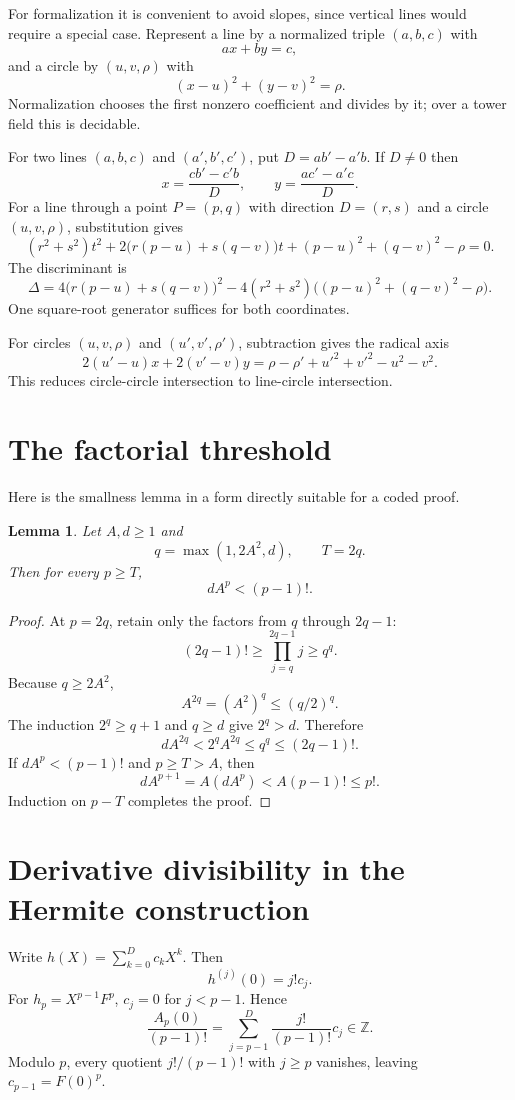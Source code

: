 \documentclass[11pt]{article}
\newtheorem{lemma}[theorem]{Lemma}
\newcommand{\Z}{\mathbb{Z}}
\begin{document}
For formalization it is convenient to avoid slopes, since vertical lines would require a special case.  Represent a line by a normalized triple $(a,b,c)$ with
\[
  ax+by=c,
\]
and a circle by $(u,v,\rho)$ with
\[
  (x-u)^2+(y-v)^2=\rho.
\]
Normalization chooses the first nonzero coefficient and divides by it; over a tower field this is decidable.

For two lines $(a,b,c)$ and $(a',b',c')$, put $D=ab'-a'b$.  If $D\ne0$ then
\[
  x=\frac{cb'-c'b}{D},\qquad
  y=\frac{ac'-a'c}{D}.
\]
For a line through a point $P=(p,q)$ with direction $D=(r,s)$ and a circle $(u,v,\rho)$, substitution gives
\[
  (r^2+s^2)t^2
 +2\bigl(r(p-u)+s(q-v)\bigr)t
 +(p-u)^2+(q-v)^2-\rho=0.
\]
The discriminant is
\[
  \Delta=4\bigl(r(p-u)+s(q-v)\bigr)^2
          -4(r^2+s^2)\bigl((p-u)^2+(q-v)^2-\rho\bigr).
\]
One square-root generator suffices for both coordinates.

For circles $(u,v,\rho)$ and $(u',v',\rho')$, subtraction gives the radical axis
\[
  2(u'-u)x+2(v'-v)y
   =\rho-\rho'+u'^2+v'^2-u^2-v^2.
\]
This reduces circle-circle intersection to line-circle intersection.

\section{The factorial threshold}\label{app:factorial}

Here is the smallness lemma in a form directly suitable for a coded proof.

\begin{lemma}
Let $A,d\ge1$ and
\[
  q=\max(1,2A^2,d),\qquad T=2q.
\]
Then for every $p\ge T$,
\[
  dA^p<(p-1)!.
\]
\end{lemma}

\begin{proof}
At $p=2q$, retain only the factors from $q$ through $2q-1$:
\[
  (2q-1)!\ge\prod_{j=q}^{2q-1}j\ge q^q.
\]
Because $q\ge2A^2$,
\[
  A^{2q}=(A^2)^q\le(q/2)^q.
\]
The induction $2^q\ge q+1$ and $q\ge d$ give $2^q>d$.  Therefore
\[
  dA^{2q}<2^qA^{2q}\le q^q\le(2q-1)!.
\]
If $dA^p<(p-1)!$ and $p\ge T>A$, then
\[
  dA^{p+1}=A(dA^p)<A(p-1)!\le p!.
\]
Induction on $p-T$ completes the proof.
\end{proof}

\section{Derivative divisibility in the Hermite construction}

Write $h(X)=\sum_{k=0}^{D}c_kX^k$.  Then
\[
  h^{(j)}(0)=j!c_j.
\]
For $h_p=X^{p-1}F^p$, $c_j=0$ for $j<p-1$.  Hence
\[
  \frac{A_p(0)}{(p-1)!}
  =\sum_{j=p-1}^{D}\frac{j!}{(p-1)!}c_j\in\Z.
\]
Modulo $p$, every quotient $j!/(p-1)!$ with $j\ge p$ vanishes, leaving $c_{p-1}=F(0)^p$.
\end{document}
